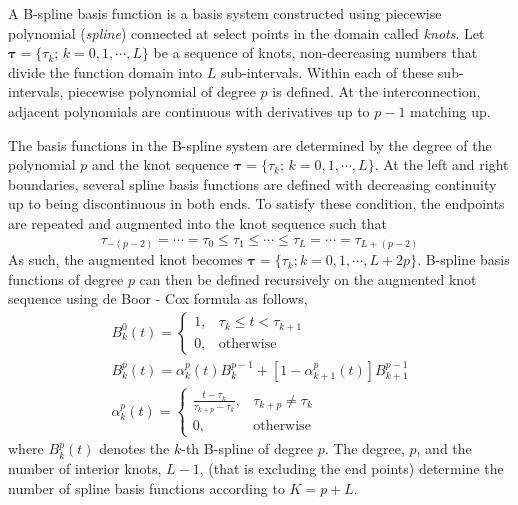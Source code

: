 A B-spline basis function is a basis system constructed using piecewise polynomial (\emph{spline}) connected at select points in the domain called \emph{knots}.
Let $\boldsymbol{\tau}=\{\tau_k; \, k = 0,1,\cdots, L\}$ be a sequence of knots, non-decreasing numbers that divide the function domain into $L$ sub-intervals.
Within each of these sub-intervals, piecewise polynomial of degree $p$ is defined.
At the interconnection, adjacent polynomials are continuous with derivatives up to $p-1$ matching up.

The basis functions in the B-spline system are determined by the degree of the polynomial $p$ and the knot sequence $\boldsymbol{\tau}=\{\tau_k; \, k = 0,1,\cdots, L\}$.
At the left and right boundaries, several spline basis functions are defined with decreasing continuity up to being discontinuous in both ends.
To satisfy these condition, the endpoints are repeated and augmented into the knot sequence such that
\begin{equation}
	\tau_{-(p-2)} = \cdots = \tau_{0} \leq \tau_{1} \leq \cdots \leq \tau_{L} = \cdots = \tau_{L+(p-2)} 
\label{eq:augmented_knots}
\end{equation}
As such, the augmented knot becomes $\boldsymbol{\tau}=\{\tau_k; k = 0,1,\cdots, L + 2p\}$.
B-spline basis functions of degree $p$ can then be defined recursively on the augmented knot sequence using de Boor - Cox formula as follows, 
\begin{equation}
	\begin{split}
		B^0_k (t) = 
			\begin{cases}
				1, & \tau_k \leq t < \tau_{k+1} \\
			0, & \text{otherwise}
	\end{cases} \\
	B^p_k (t) =  \alpha^p_k (t) B^{p-1}_k + \left[1 - \alpha^p_{k+1} (t)\right] B^{p-1}_{k+1} \\
	\alpha^p_k (t) =
	\begin{cases}
				\frac{t - \tau_k}{\tau_{k+p}-\tau_k}, & \tau_{k+p} \neq \tau_k \\
			  0, & \text{otherwise}
	\end{cases}
	\end{split} 
\label{eq:deboor_cox}
\end{equation}
where $B_k^p (t)$ denotes the $k$-th B-spline of degree $p$.
The degree, $p$, and the number of interior knots, $L-1$, (that is excluding the end points) determine the number of spline basis functions according to $K = p + L$.

